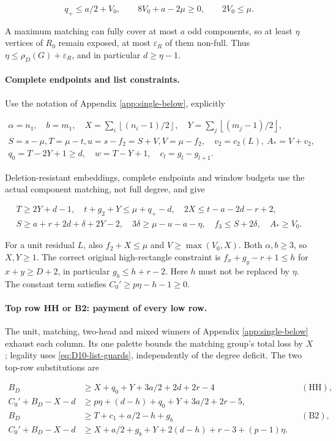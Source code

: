 \documentclass[11pt,a4paper]{article}
\newcommand{\floor}[1]{\left\lfloor#1\right\rfloor}
\theoremstyle{definition}
\begin{document}
\[
 q_+\le a/2+V_0,\qquad 8V_0+a-2\mu\ge0,\qquad2V_0\le\mu.
\]

A maximum matching can fully cover at most $a$ odd components, so at least $\eta$ vertices of $R_0$ remain exposed, at most $\varepsilon_R$ of them non-full. Thus $\eta\le\rho_D(G)+\varepsilon_R$, and in particular $d\ge\eta-1$.

\paragraph{Complete endpoints and list constraints.}
Use the notation of Appendix \ref{app:single-below}, explicitly

\begin{gather*}
 \alpha=n_1,\quad b=m_1,\quad X=\sum_i\floor{(n_i-1)/2},\quad
 Y=\sum_j\floor{(m_j-1)/2},\\
 S=s-\mu, T=\mu-t, u=s-f_2=S+V, V=\mu-f_2,\quad
 v_2=c_2(L),\ A_*=V+v_2,\\
 q_0=T-2Y+1\ge d,\quad w=T-Y+1,\quad c_l=g_l-g_{l+1}.
\end{gather*}

Deletion-resistant embeddings, complete endpoints and window budgets use the actual component matching, not full degree, and give

\begin{gather}
 T\ge2Y+d-1,\quad t+g_2+Y\le\mu+q_+-d,\quad
 2X\le t-a-2d-r+2,\label{eq:D10-list-guards}\\
 S\ge a+r+2d+\delta+2Y-2,\quad
 3\delta\ge\mu-u-a-\eta,\quad f_3\le S+2\delta,\quad A_*\ge V_0.\nonumber
\end{gather}

For a unit residual $L$, also $f_2+X\le\mu$ and $V\ge\max(V_0,X)$. Both $\alpha,b\ge3$, so $X,Y\ge1$. The correct original high-rectangle constraint is $f_x+g_y-r+1\le h$ for $x+y\ge D+2$, in particular $g_b\le h+r-2$. Here $h$ must not be replaced by $\eta$. The constant term satisfies $C_0'\ge p\eta-h-1\ge0$.

\paragraph{Top row HH or B2: payment of every low row.}
The unit, matching, two-head and mixed winners of Appendix \ref{app:single-below} exhaust each column. Its one palette bounds the matching group's total loss by $X$; legality uses \eqref{eq:D10-list-guards}, independently of the degree deficit. The two top-row substitutions are

\begin{align}
 B_D&\ge X+q_0+Y+3a/2+2d+2r-4 &&(\mathrm{HH}),\nonumber\\
 C_0'+B_D-X-d
 &\ge p\eta+(d-h)+q_0+Y+3a/2+2r-5,\label{eq:D10-HH}\\
 B_D&\ge T+c_1+a/2-h+g_b &&(\mathrm{B2}),\nonumber\\
 C_0'+B_D-X-d
 &\ge X+a/2+g_b+Y+2(d-h)+r-3+(p-1)\eta.\label{eq:D10-B2}
\end{align}
\end{document}
